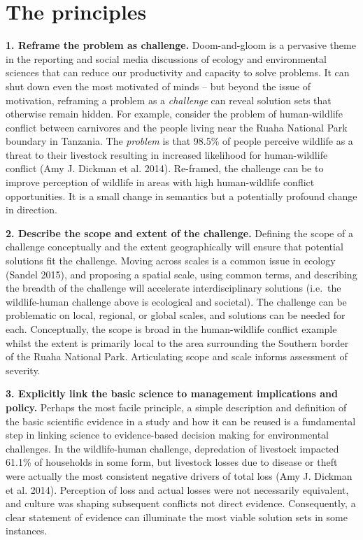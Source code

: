 \documentclass[fleqn,10pt]{wlpeerj} %
\begin{document}
\section*{The principles}\label{the-principles}

\textbf{1. Reframe the problem as challenge.} Doom-and-gloom is a
pervasive theme in the reporting and social media discussions of ecology
and environmental sciences that can reduce our productivity and capacity
to solve problems. It can shut down even the most motivated of minds --
but beyond the issue of motivation, reframing a problem as a
\emph{challenge} can reveal solution sets that otherwise remain hidden.
For example, consider the problem of human-wildlife conflict between
carnivores and the people living near the Ruaha National Park boundary
in Tanzania. The \emph{problem} is that 98.5\% of people perceive
wildlife as a threat to their livestock resulting in increased
likelihood for human-wildlife conflict (Amy J. Dickman et al. 2014).
Re-framed, the challenge can be to improve perception of wildlife in
areas with high human-wildlife conflict opportunities. It is a small
change in semantics but a potentially profound change in direction.

\textbf{2. Describe the scope and extent of the challenge.} Defining the
scope of a challenge conceptually and the extent geographically will
ensure that potential solutions fit the challenge. Moving across scales
is a common issue in ecology (Sandel 2015), and proposing a spatial
scale, using common terms, and describing the breadth of the challenge
will accelerate interdisciplinary solutions (i.e.~the wildlife-human
challenge above is ecological and societal). The challenge can be
problematic on local, regional, or global scales, and solutions can be
needed for each. Conceptually, the scope is broad in the human-wildlife
conflict example whilst the extent is primarily local to the area
surrounding the Southern border of the Ruaha National Park. Articulating
scope and scale informs assessment of severity.

\textbf{3. Explicitly link the basic science to management implications
and policy.} Perhaps the most facile principle, a simple description and
definition of the basic scientific evidence in a study and how it can be
reused is a fundamental step in linking science to evidence-based
decision making for environmental challenges. In the wildlife-human
challenge, depredation of livestock impacted 61.1\% of households in
some form, but livestock losses due to disease or theft were actually
the most consistent negative drivers of total loss (Amy J. Dickman et
al. 2014). Perception of loss and actual losses were not necessarily
equivalent, and culture was shaping subsequent conflicts not direct
evidence. Consequently, a clear statement of evidence can illuminate the
most viable solution sets in some instances.
\end{document}
